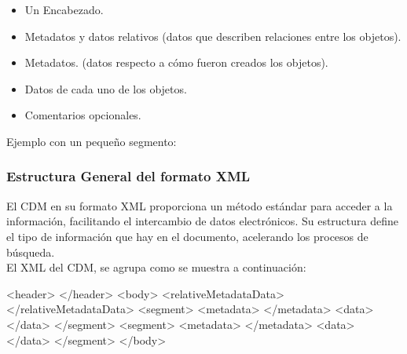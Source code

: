 {\begin{itemize}
\itemsep0em
\item Un Encabezado.
\item Metadatos y datos relativos (datos que describen relaciones entre los objetos).
\item Metadatos. (datos respecto a c\'omo fueron creados los objetos).
\item Datos de cada uno de los objetos.
\item Comentarios opcionales.
\end{itemize}

Ejemplo con un peque\~no segmento:\\



\subsubsection*{Estructura General del formato XML}
El CDM en su formato \ac{XML} proporciona un m\'etodo est\'andar para acceder a la informaci\'on, facilitando el intercambio de datos electr\'onicos. Su estructura define el tipo de informaci\'on que hay en el documento, acelerando los procesos de b\'usqueda.\\
El XML del CDM, se agrupa como se muestra a continuaci\'on:

\begin{verbbox}
<header>
</header>
<body>
  <relativeMetadataData>
  </relativeMetadataData>
  <segment>
    <metadata>
    </metadata>
    <data>
    </data>
  </segment>
  <segment>
    <metadata>
    </metadata>
    <data>
    </data>
  </segment>
</body>\\
\end{verbbox}

}
